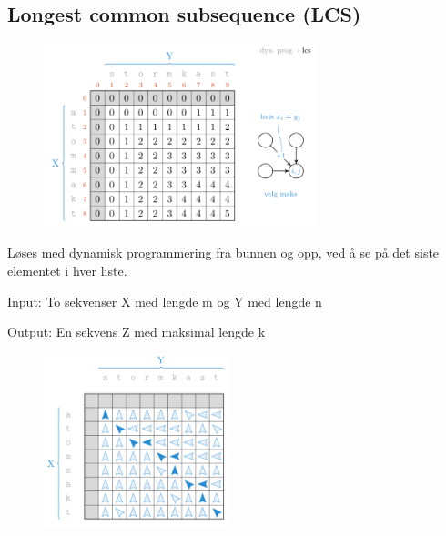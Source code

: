 \documentclass[12pt]{report}
\begin{document}
\vspace{\baselineskip}
\setlength{\parskip}{6.0pt}

\vspace{\baselineskip}
\subsection*{Longest common subsequence (LCS)}



\begin{figure}[H]
\advance\leftskip 3.89in		\includegraphics[width=3.12in,height=2.1in]{./media/image53.png}
\end{figure}



\setlength{\parskip}{10.56pt}
Løses med dynamisk programmering fra bunnen og opp, ved å se på det siste elementet i hver liste.\par

Input: To sekvenser X med lengde m og Y med lengde n\par

Output: En sekvens Z med maksimal lengde k \par




\begin{figure}[H]
\advance\leftskip 4.79in		\includegraphics[width=2.12in,height=2.0in]{./media/image54.png}
\end{figure}
\end{document}
